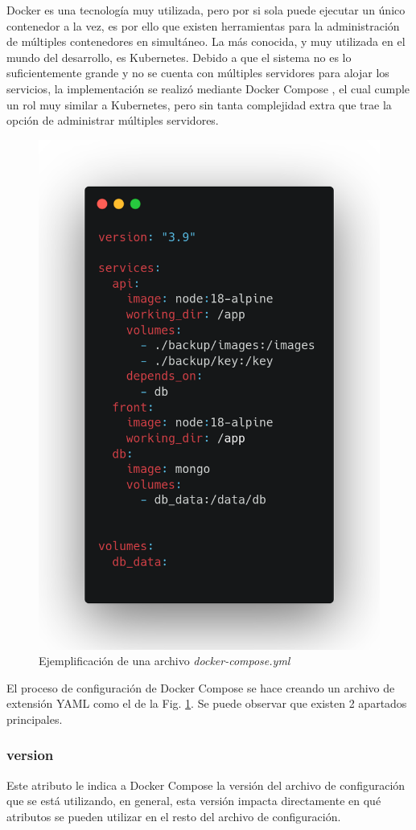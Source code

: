 Docker es una tecnología muy utilizada, pero por si sola puede ejecutar un único contenedor a la vez, es por ello que existen herramientas para la administración de múltiples contenedores en simultáneo. La más conocida, y muy utilizada en el mundo del desarrollo, es Kubernetes. Debido a que el sistema no es lo suficientemente grande y no se cuenta con múltiples servidores para alojar los servicios, la implementación se realizó mediante Docker Compose \cite{docker_inc_docker_2023}, el cual cumple un rol muy similar a Kubernetes, pero sin tanta complejidad extra que trae la opción de administrar múltiples servidores.
\begin{figure}
    \centering
    \includegraphics[width=.5\textwidth]{imgs/docker-compose.png}
    \caption{Ejemplificación de una archivo \textit{docker-compose.yml}}
    \label{fig:docker-compose-yml}
\end{figure}

El proceso de configuración de Docker Compose se hace creando un archivo de extensión YAML como el de la Fig. \ref{fig:docker-compose-yml}. Se puede observar que existen 2 apartados principales.

\subsubsection*{version}

Este atributo le indica a Docker Compose la versión del archivo de configuración que se está utilizando, en general, esta versión impacta directamente en qué atributos se pueden utilizar en el resto del archivo de configuración.

